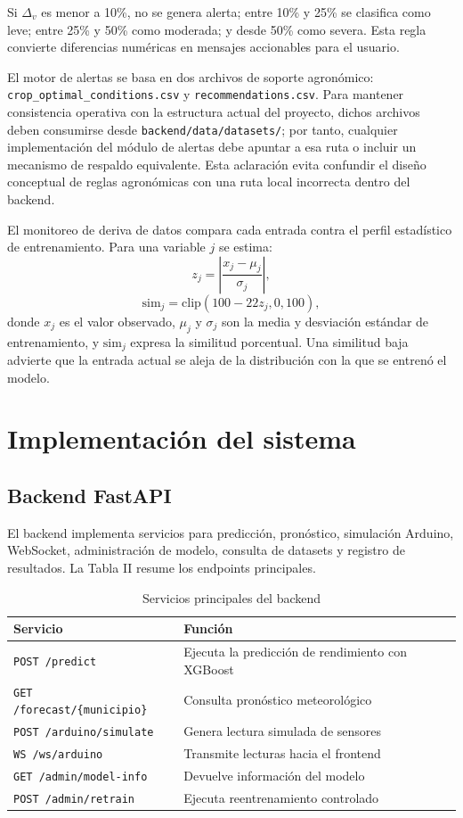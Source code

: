 \documentclass[conference,a4paper]{IEEEtran}
\begin{document}
Si $\Delta_v$ es menor a 10\%, no se genera alerta; entre 10\% y 25\% se clasifica como leve; entre 25\% y 50\% como moderada; y desde 50\% como severa. Esta regla convierte diferencias numéricas en mensajes accionables para el usuario.

El motor de alertas se basa en dos archivos de soporte agronómico: \texttt{crop\_optimal\_conditions.csv} y \texttt{recommendations.csv}. Para mantener consistencia operativa con la estructura actual del proyecto, dichos archivos deben consumirse desde \texttt{backend/data/datasets/}; por tanto, cualquier implementación del módulo de alertas debe apuntar a esa ruta o incluir un mecanismo de respaldo equivalente. Esta aclaración evita confundir el diseño conceptual de reglas agronómicas con una ruta local incorrecta dentro del backend.

El monitoreo de deriva de datos compara cada entrada contra el perfil estadístico de entrenamiento. Para una variable $j$ se estima:
\begin{equation}
z_j=\left|\frac{x_j-\mu_j}{\sigma_j}\right|,
\end{equation}
\begin{equation}
\mathrm{sim}_j=\mathrm{clip}(100-22z_j,0,100),
\end{equation}
donde $x_j$ es el valor observado, $\mu_j$ y $\sigma_j$ son la media y desviación estándar de entrenamiento, y $\mathrm{sim}_j$ expresa la similitud porcentual. Una similitud baja advierte que la entrada actual se aleja de la distribución con la que se entrenó el modelo.

\section{Implementación del sistema}
\subsection{Backend FastAPI}
El backend implementa servicios para predicción, pronóstico, simulación Arduino, WebSocket, administración de modelo, consulta de datasets y registro de resultados. La Tabla II resume los endpoints principales.

\begin{table}[!t]
\caption{Servicios principales del backend}
\centering
\scriptsize
\begin{tabularx}{\linewidth}{p{2.8cm}X}
\toprule
\textbf{Servicio} & \textbf{Función} \\
\midrule
\texttt{POST /predict} & Ejecuta la predicción de rendimiento con XGBoost \\
\texttt{GET /forecast/\{municipio\}} & Consulta pronóstico meteorológico \\
\texttt{POST /arduino/simulate} & Genera lectura simulada de sensores \\
\texttt{WS /ws/arduino} & Transmite lecturas hacia el frontend \\
\texttt{GET /admin/model-info} & Devuelve información del modelo \\
\texttt{POST /admin/retrain} & Ejecuta reentrenamiento controlado \\
\bottomrule
\end{tabularx}
\end{table}
\end{document}
